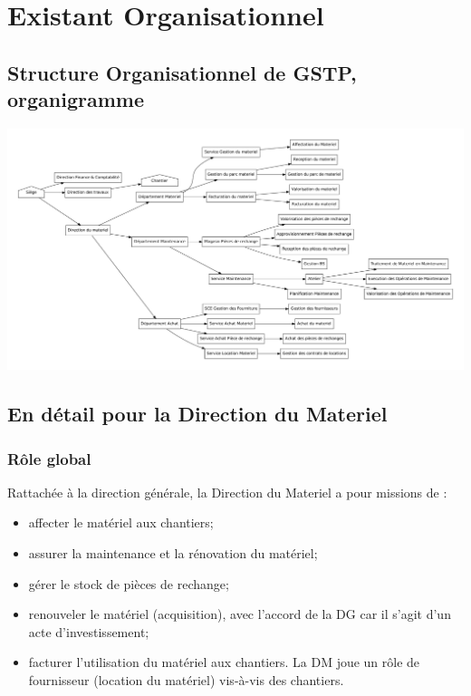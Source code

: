 \section{Existant Organisationnel}
    \subsection{Structure Organisationnel de GSTP, organigramme}
        \includegraphics[width=\textwidth]{img/structureOrganisationnel.pdf}


    \subsection{En détail pour la Direction du Materiel}
        \subsubsection{Rôle global}
            Rattachée à la direction générale, la Direction du Materiel a pour missions de :
            \begin{itemize}
                \item affecter le matériel aux chantiers;
                \item assurer la maintenance et la rénovation du matériel;
                \item gérer le stock de pièces de rechange;
                \item renouveler le matériel (acquisition), avec l'accord de la DG car il s'agit d'un acte d'investissement;
                \item facturer l'utilisation du matériel aux chantiers. La DM joue un rôle de fournisseur (location du matériel) vis-à-vis des chantiers.
            \end{itemize}
            
